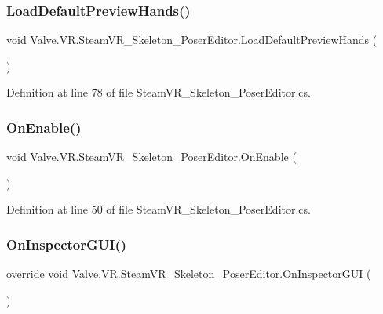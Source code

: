 \subsubsection{\texorpdfstring{LoadDefaultPreviewHands()}{LoadDefaultPreviewHands()}}
{\footnotesize\ttfamily void Valve.\+V\+R.\+Steam\+V\+R\+\_\+\+Skeleton\+\_\+\+Poser\+Editor.\+Load\+Default\+Preview\+Hands (\begin{DoxyParamCaption}{ }\end{DoxyParamCaption})\hspace{0.3cm}{\ttfamily [protected]}}



Definition at line 78 of file Steam\+V\+R\+\_\+\+Skeleton\+\_\+\+Poser\+Editor.\+cs.

\mbox{\label{class_valve_1_1_v_r_1_1_steam_v_r___skeleton___poser_editor_aa9add297893896ac7e3db8b6158790f3}} 
\subsubsection{\texorpdfstring{OnEnable()}{OnEnable()}}
{\footnotesize\ttfamily void Valve.\+V\+R.\+Steam\+V\+R\+\_\+\+Skeleton\+\_\+\+Poser\+Editor.\+On\+Enable (\begin{DoxyParamCaption}{ }\end{DoxyParamCaption})\hspace{0.3cm}{\ttfamily [protected]}}



Definition at line 50 of file Steam\+V\+R\+\_\+\+Skeleton\+\_\+\+Poser\+Editor.\+cs.

\mbox{\label{class_valve_1_1_v_r_1_1_steam_v_r___skeleton___poser_editor_a04b3335f0544e31c32be61f1ebc3a4ff}} 
\subsubsection{\texorpdfstring{OnInspectorGUI()}{OnInspectorGUI()}}
{\footnotesize\ttfamily override void Valve.\+V\+R.\+Steam\+V\+R\+\_\+\+Skeleton\+\_\+\+Poser\+Editor.\+On\+Inspector\+G\+UI (\begin{DoxyParamCaption}{ }\end{DoxyParamCaption})}



